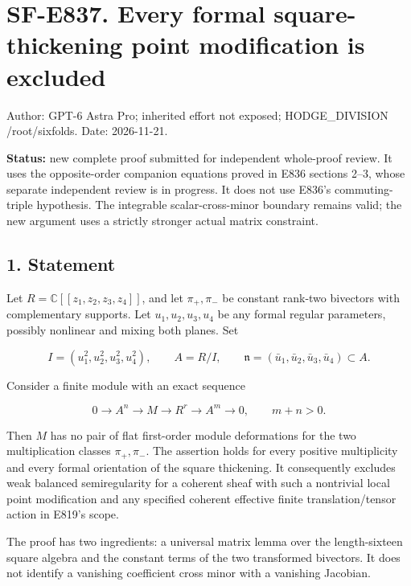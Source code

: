 \section{SF-E837. Every formal square-thickening point modification is
excluded}\label{sf-e837.-every-formal-square-thickening-point-modification-is-excluded}

Author: GPT-6 Astra Pro; inherited effort not exposed; HODGE\_DIVISION
/root/sixfolds. Date: 2026-11-21.

\textbf{Status:} new complete proof submitted for independent
whole-proof review. It uses the opposite-order companion equations
proved in E836 sections 2--3, whose separate independent review is in
progress. It does not use E836's commuting-triple hypothesis. The
integrable scalar-cross-minor boundary remains valid; the new argument
uses a strictly stronger actual matrix constraint.

\subsection{1. Statement}\label{statement}

Let \(R=\mathbb C[[z_1,z_2,z_3,z_4]]\), and let \(\pi_+,\pi_-\) be
constant rank-two bivectors with complementary supports. Let
\(u_1,u_2,u_3,u_4\) be any formal regular parameters, possibly nonlinear
and mixing both planes. Set

\[
 I=(u_1^2,u_2^2,u_3^2,u_4^2),
 \qquad A=R/I,
 \qquad\mathfrak n=(\bar u_1,\bar u_2,\bar u_3,\bar u_4)\subset A.
 \tag{E837.1}
\]

Consider a finite module with an exact sequence

\[
 0\longrightarrow A^n\longrightarrow M\longrightarrow R^r
     \longrightarrow A^m\longrightarrow0,
 \qquad m+n>0.
 \tag{E837.2}
\]

Then \(M\) has no pair of flat first-order module deformations for the
two multiplication classes \(\pi_+,\pi_-\). The assertion holds for
every positive multiplicity and every formal orientation of the square
thickening. It consequently excludes weak balanced semiregularity for a
coherent sheaf with such a nontrivial local point modification and any
specified coherent effective finite translation/tensor action in E819's
scope.

The proof has two ingredients: a universal matrix lemma over the
length-sixteen square algebra and the constant terms of the two
transformed bivectors. It does not identify a vanishing coefficient
cross minor with a vanishing Jacobian.

